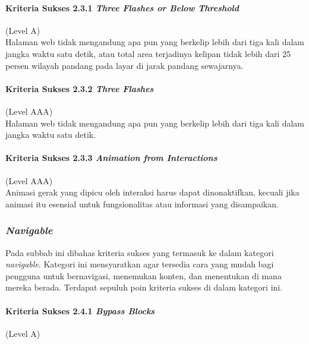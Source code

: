 \paragraph{Kriteria Sukses 2.3.1 \textit{Three Flashes or Below Threshold}}
\label{sec:kriteria_sukses_2.3.1}
(Level A)\\

Halaman web tidak mengandung apa pun yang berkelip lebih dari tiga kali dalam jangka waktu satu detik, atau total area terjadinya kelipan tidak lebih dari 25 persen wilayah pandang pada layar di jarak pandang sewajarnya. 

\paragraph{Kriteria Sukses 2.3.2 \textit{Three Flashes}}
\label{sec:kriteria_sukses_2.3.2}
(Level AAA)\\

Halaman web tidak mengandung apa pun yang berkelip lebih dari tiga kali dalam jangka waktu satu detik.

\paragraph{Kriteria Sukses 2.3.3 \textit{Animation from Interactions}}
\label{sec:kriteria_sukses_2.3.3}
(Level AAA)\\

Animasi gerak yang dipicu oleh interaksi harus dapat dinonaktifkan, kecuali jika animasi itu esensial untuk fungsionalitas atau informasi yang disampaikan.

\subsubsection{\textit{Navigable}}
\label{sec:navigable}
Pada subbab ini dibahas kriteria sukses yang termasuk ke dalam kategori \textit{navigable}. Kategori ini mensyaratkan agar tersedia cara yang mudah bagi pengguna untuk bernavigasi, menemukan konten, dan menentukan di mana mereka berada. Terdapat sepuluh poin kriteria sukses di dalam kategori ini.

\paragraph{Kriteria Sukses 2.4.1 \textit{Bypass Blocks}}
\label{sec:kriteria_sukses_2.4.1}
(Level A)\\

